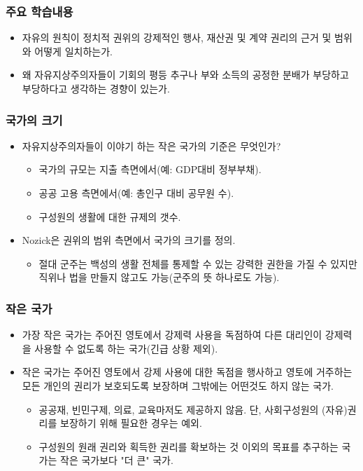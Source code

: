 \documentclass[aspectratio=169,xcolor=dvipsnames,handout]{beamer}
\begin{document}
\begin{frame}[<+->]
\frametitle{주요 학습내용}
    \begin{itemize}
        \item 자유의 원칙이 정치적 권위의 강제적인 행사, 재산권 및 계약 권리의 근거 및 범위와 어떻게 일치하는가.
        \item 왜 자유지상주의자들이 기회의 평등 추구나 부와 소득의 공정한 분배가 부당하고 부당하다고 생각하는 경향이 있는가.
    \end{itemize}
\end{frame}

\begin{frame}[<+->]
\frametitle{국가의 크기}
    \begin{itemize}
        \item 자유지상주의자들이 이야기 하는 작은 국가의 기준은 무엇인가?
        \begin{itemize}
            \item 국가의 규모는 지출 측면에서(예: GDP대비 정부부채).
            \item 공공 고용 측면에서(예: 총인구 대비 공무원 수).
            \item 구성원의 생활에 대한 규제의 갯수.
        \end{itemize}
        \item Nozick은 권위의 범위 측면에서 국가의 크기를 정의.
        \begin{itemize}
            \item 절대 군주는 백성의 생활 전체를 통제할 수 있는 강력한 권한을 가질 수 있지만 직위나 법을 만들지 않고도 가능(군주의 뜻 하나로도 가능).
        \end{itemize}
    \end{itemize}
\end{frame}

\begin{frame}[<+->]
\frametitle{작은 국가}
    \begin{itemize}
        \item 가장 작은 국가는 주어진 영토에서 강제력 사용을 독점하여 다른 대리인이 강제력을 사용할 수 없도록 하는 국가(긴급 상황 제외).
        \item 작은 국가는 주어진 영토에서 강제 사용에 대한 독점을 행사하고 영토에 거주하는 모든 개인의 권리가 보호되도록 보장하며 그밖에는 어떤것도 하지 않는 국가.
        \begin{itemize}
            \item 공공재, 빈민구제, 의료, 교육마저도 제공하지 않음. 단, 사회구성원의 (자유)권리를 보장하기 위해 필요한 경우는 예외.
            \item 구성원의 원래 권리와 획득한 권리를 확보하는 것 이외의 목표를 추구하는 국가는 작은 국가보다 "더 큰" 국가.
        \end{itemize}
    \end{itemize}
\end{frame}
\end{document}
